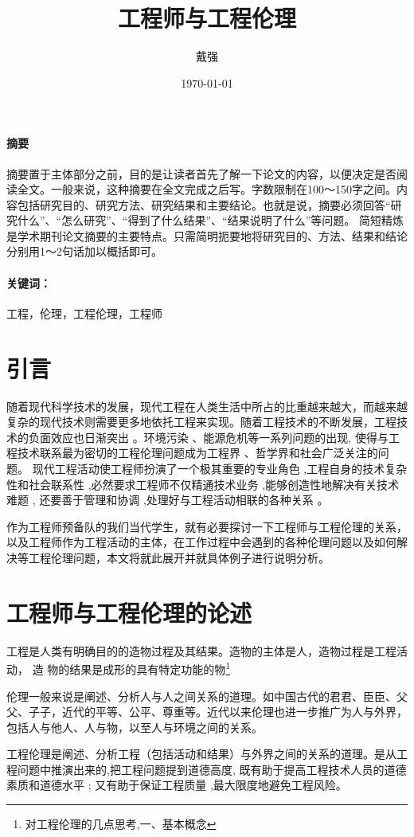 \documentclass[a4paper,12pt]{ctexart}
\title{工程师与工程伦理}
\author{戴强}
\date{\today}
\renewenvironment*{abstract}[1]{%
\newcommand\gjc{#1}
\paragraph{摘要}
}{\paragraph{关键词：}\gjc }
\begin{document}
\maketitle
\newpage
\tableofcontents
\newpage
\quad
\quad

\begin{abstract}{工程，伦理，工程伦理，工程师}
摘要置于主体部分之前，目的是让读者首先了解一下论文的内容，以便决定是否阅读全文。一般来说，这种摘要在全文完成之后写。字数限制在100～150字之间。内容包括研究目的、研究方法、研究结果和主要结论。也就是说，摘要必须回答“研究什么”、“怎么研究”、“得到了什么结果”、“结果说明了什么”等问题。
简短精炼是学术期刊论文摘要的主要特点。只需简明扼要地将研究目的、方法、结果和结论分别用1～2句话加以概括即可。
\end{abstract}

\newpage
\section{引言}
随着现代科学技术的发展，现代工程在人类生活中所占的比重越来越大，而越来越复杂的现代技术则需要更多地依托工程来实现。随着工程技术的不断发展，工程技术的负面效应也日渐突出 。环境污染 、能源危机等一系列问题的出现, 使得与工程技术联系最为密切的工程伦理问题成为工程界 、哲学界和社会广泛关注的问题。
现代工程活动使工程师扮演了一个极其重要的专业角色 ,工程自身的技术复杂性和社会联系性 ,必然要求工程师不仅精通技术业务 ,能够创造性地解决有关技术难题 , 还要善于管理和协调 ,处理好与工程活动相联的各种关系 。

作为工程师预备队的我们当代学生，就有必要探讨一下工程师与工程伦理的关系，以及工程师作为工程活动的主体，在工作过程中会遇到的各种伦理问题以及如何解决等工程伦理问题，本文将就此展开并就具体例子进行说明分析。
\section{工程师与工程伦理的论述}
工程是人类有明确目的的造物过程及其结果。造物的主体是人，造物过程是工程活动， 造
物的结果是成形的具有特定功能的物\footnote{对工程伦理的几点思考,一、基本概念}

伦理一般来说是阐述、分析人与人之间关系的道理。如中国古代的君君、臣臣、父父、子子，近代的平等、公平、尊重等。近代以来伦理也进一步推广为人与外界，包括人与他人、人与物，以至人与环境之间的关系。

工程伦理是阐述、分析工程（包括活动和结果）与外界之间的关系的道理。是从工程问题中推演出来的,把工程问题提到道德高度, 既有助于提高工程技术人员的道德素质和道德水平 ; 又有助于保证工程质量 ,最大限度地避免工程风险。
\end{document}

